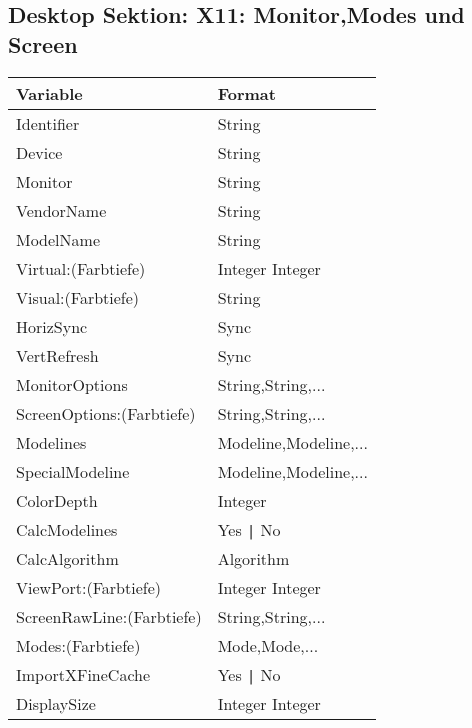 \subsection{Desktop Sektion: X11: Monitor,Modes und Screen}
\begin{tabular}[h]{|p{5cm}|p{7cm}|}
 \hline
 \textbf{Variable}     & \textbf{Format}        \\
 \hline
 Identifier                & String                          \\  
 Device                    & String                          \\
 Monitor                   & String                          \\
 VendorName                & String                          \\
 ModelName                 & String                          \\
 Virtual:(Farbtiefe)       & Integer Integer                 \\
 Visual:(Farbtiefe)        & String                          \\
 HorizSync                 & Sync                            \\
 VertRefresh               & Sync                            \\
 MonitorOptions            & String,String,...               \\
 ScreenOptions:(Farbtiefe) & String,String,...               \\
 Modelines                 & Modeline,Modeline,...           \\
 SpecialModeline           & Modeline,Modeline,...           \\
 ColorDepth                & Integer                         \\
 CalcModelines             & Yes \verb+|+ No                 \\
 CalcAlgorithm             & Algorithm                       \\
 ViewPort:(Farbtiefe)      & Integer Integer                 \\
 ScreenRawLine:(Farbtiefe) & String,String,...               \\
 Modes:(Farbtiefe)         & Mode,Mode,...                   \\
 ImportXFineCache          & Yes \verb+|+ No                 \\
 DisplaySize               & Integer Integer                 \\
 \hline
\end{tabular}\\

